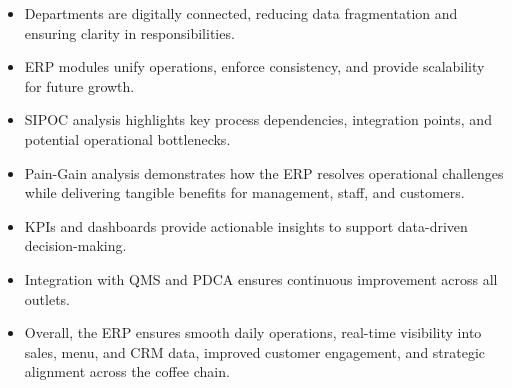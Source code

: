 \begin{itemize}
    \item Departments are digitally connected, reducing data fragmentation and ensuring clarity in responsibilities.
    \item ERP modules unify operations, enforce consistency, and provide scalability for future growth.
    \item SIPOC analysis highlights key process dependencies, integration points, and potential operational bottlenecks.
    \item Pain-Gain analysis demonstrates how the ERP resolves operational challenges while delivering tangible benefits for management, staff, and customers.
    \item KPIs and dashboards provide actionable insights to support data-driven decision-making.
    \item Integration with QMS and PDCA ensures continuous improvement across all outlets.
    \item Overall, the ERP ensures smooth daily operations, real-time visibility into sales, menu, and CRM data, improved customer engagement, and strategic alignment across the coffee chain.
\end{itemize}
